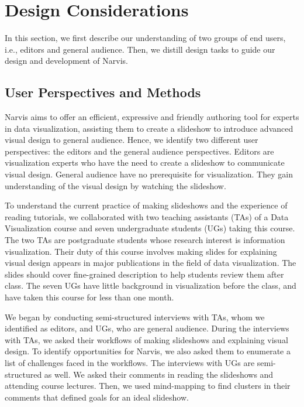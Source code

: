 \section{Design Considerations}
In this section, we first describe our understanding of two groups of end users, i.e., editors and general audience. Then, we distill design tasks to guide our design and development of Narvis.

\subsection{User Perspectives and Methods}

Narvis aims to offer an efficient, expressive and friendly authoring tool for experts in data visualization, assisting them to create a slideshow to introduce advanced visual design to general audience.  
Hence, we identify two different user perspectives: the editors and the general audience perspectives. Editors are visualization experts who have the need to create a slideshow to communicate visual design. General audience have no prerequisite for visualization. They gain understanding of the visual design by watching the slideshow. 

To understand the current practice of making slideshows and the experience of reading tutorials, we collaborated with two teaching assistants (TAs) of a Data Visualization course and seven undergraduate students (UGs) taking this course. The two TAs are postgraduate students whose research interest is information visualization. Their duty of this course involves making slides for explaining visual design appears in major publications in the field of data visualization. The slides should cover fine-grained description to help students review them after class. The seven UGs have little background in visualization before the class, and have taken this course for less than one month.  

We began by conducting semi-structured interviews with TAs, whom we identified as editors, and UGs, who are general audience. During the interviews with TAs, we asked their workflows of making slideshows and explaining visual design. To identify opportunities for Narvis, we also asked them to enumerate a list of challenges faced in the workflows. The interviews with UGs are semi-structured as well. We asked their comments in reading the slideshows and attending course lectures. Then, we used mind-mapping to find clusters in their comments that defined goals for an ideal slideshow. 


